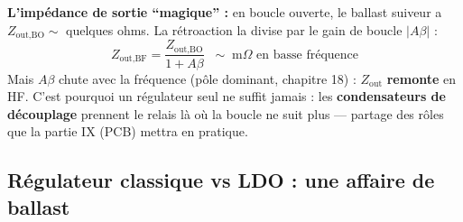 \documentclass[12pt,a4paper,twoside]{book}
\begin{document}
\begin{intuition}
\textbf{L'impédance de sortie ``magique'' :} en boucle ouverte, le ballast suiveur a $Z_{\text{out,BO}} \sim$ quelques ohms. La rétroaction la divise par le gain de boucle $|A\beta|$ :
\[
Z_{\text{out,BF}} = \frac{Z_{\text{out,BO}}}{1 + A\beta} \;\;\sim\; \text{m}\Omega \text{ en basse fréquence}
\]
Mais $A\beta$ chute avec la fréquence (pôle dominant, chapitre 18) : $Z_{\text{out}}$ \textbf{remonte} en HF. C'est pourquoi un régulateur seul ne suffit jamais : les \textbf{condensateurs de découplage} prennent le relais là où la boucle ne suit plus --- partage des rôles que la partie IX (PCB) mettra en pratique.
\end{intuition}

\subsection{Régulateur classique vs LDO : une affaire de ballast}
\end{document}
